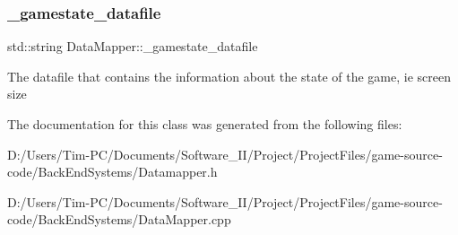 \subsubsection{\texorpdfstring{\+\_\+gamestate\+\_\+datafile}{\_gamestate\_datafile}}
{\footnotesize\ttfamily std\+::string Data\+Mapper\+::\+\_\+gamestate\+\_\+datafile\hspace{0.3cm}{\ttfamily [private]}}

The datafile that contains the information about the state of the game, ie screen size 

The documentation for this class was generated from the following files\+:\begin{DoxyCompactItemize}
\item 
D\+:/\+Users/\+Tim-\/\+P\+C/\+Documents/\+Software\+\_\+\+I\+I/\+Project/\+Project\+Files/game-\/source-\/code/\+Back\+End\+Systems/Datamapper.\+h\item 
D\+:/\+Users/\+Tim-\/\+P\+C/\+Documents/\+Software\+\_\+\+I\+I/\+Project/\+Project\+Files/game-\/source-\/code/\+Back\+End\+Systems/Data\+Mapper.\+cpp\end{DoxyCompactItemize}
